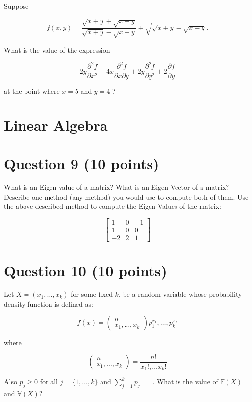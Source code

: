 Suppose

$$
f(x, y)=\frac{\sqrt{x+y}+\sqrt{x-y}}{\sqrt{x+y}-\sqrt{x-y}}+\sqrt{\sqrt{x+y}-\sqrt{x-y}} .
$$

What is the value of the expression

$$
2 y \frac{\partial^{2} f}{\partial x^{2}}+4 x \frac{\partial^{2} f}{\partial x \partial y}+2 y \frac{\partial^{2} f}{\partial y^{2}}+2 \frac{\partial f}{\partial y}
$$

at the point where $x=5$ and $y=4$ ?

\section{Linear Algebra}

\section{Question 9 (10 points)}

What is an Eigen value of a matrix? What is an Eigen Vector of a matrix? Describe one method (any method) you would use to compute both of them. Use the above described method to compute the Eigen Values of the matrix:

$$
\left[\begin{array}{ccc}
1 & 0 & -1 \\
1 & 0 & 0 \\
-2 & 2 & 1
\end{array}\right]
$$



\section{Question 10 (10 points)}

Let $X=\left(x_{1}, \ldots, x_{k}\right)$ for some fixed $k$, be a random variable whose probability density function is defined as:

$$
f(x)=\left(\begin{array}{c}
n \\
x_{1}, \ldots, x_{k}
\end{array}\right) p_{1}^{x_{1}}, \ldots, p_{k}^{x_{k}}
$$

where

$$
\left(\begin{array}{c}
n \\
x_{1}, \ldots, x_{k}
\end{array}\right)=\frac{n !}{x_{1} !, \ldots x_{k} !}
$$

Also $p_{j} \geq 0$ for all $j=\{1, \ldots, k\}$ and $\sum_{j=1}^{k} p_{j}=1$. What is the value of $\mathbb{E}(X)$ and $\mathbb{V}(X) ?$